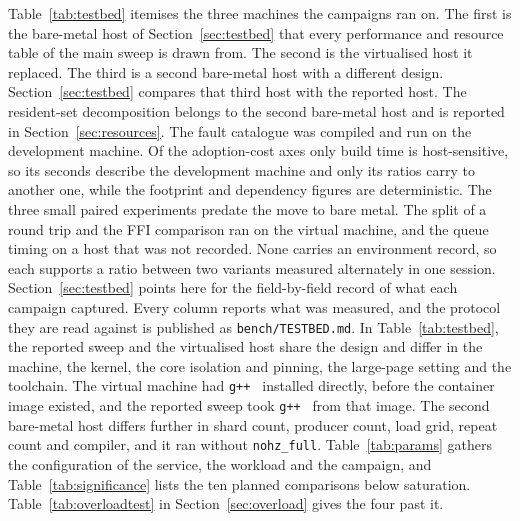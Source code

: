 \documentclass[english,oneside,a4paper,censored,csm,software-track-2020]{HYthesisML}
\begin{document}
\backmatter
\begin{appendices}

Table~\ref{tab:testbed} itemises the three machines the campaigns ran on. The first is the
bare-metal host of Section~\ref{sec:testbed} that every performance and resource table of the
main sweep is drawn from. The second is the virtualised host it replaced. The third is a second
bare-metal host with a different design. Section~\ref{sec:testbed} compares that third host
with the reported host. The resident-set decomposition belongs to the
second bare-metal host and is reported in Section~\ref{sec:resources}. The fault catalogue was
compiled and run on the development machine. Of the
adoption-cost axes only build time is host-sensitive, so its seconds describe the development
machine and only its ratios carry to another one, while the footprint and dependency figures
are deterministic. The three small paired
experiments predate the move to bare metal. The split of a round trip and the FFI comparison
ran on the virtual machine, and the queue timing on a host that was not recorded. None carries
an environment record, so each supports a ratio between two variants measured alternately in
one session. Section~\ref{sec:testbed} points
here for the field-by-field record of what each campaign captured. Every column reports what was
measured, and the protocol they are read against is published as \texttt{bench/TESTBED.md}.
In Table~\ref{tab:testbed}, the reported sweep and the virtualised host share the design and
differ in the machine, the kernel, the core isolation and pinning, the large-page setting and
the toolchain. The virtual machine had \texttt{g++~\GuestGpp} installed directly, before the
container image existed, and the reported sweep took \texttt{g++~\MainGpp} from that image.
The second bare-metal host differs further in shard count, producer count, load grid, repeat
count and compiler, and it ran without \texttt{nohz\_full}. Table~\ref{tab:params} gathers
the configuration of the service, the workload and the campaign, and
Table~\ref{tab:significance} lists the ten planned comparisons below saturation.
Table~\ref{tab:overloadtest} in Section~\ref{sec:overload} gives the four past it.


\end{appendices}
\end{document}
